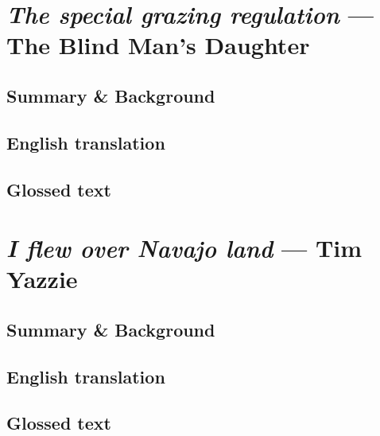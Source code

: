 \documentclass[output=book,
		  ]{langscibook}
\begin{document}
    \chapter{\textit{The special grazing regulation} — The Blind Man's Daughter}\label{chapter:text08}
    \setcounter{equation}{0}
        \tocless\section{Summary \& Background}
            
        \tocless\section{English translation}
             
           \tocless\section{Glossed text}
            
        \newpage
    \chapter{\textit{I flew over Navajo land} — Tim Yazzie}\label{chapter:text09}
    \setcounter{equation}{0}
        \tocless\section{Summary \& Background}
            
        \tocless\section{English translation}
             
           \tocless\section{Glossed text}
            
        \newpage

        



\end{document}
